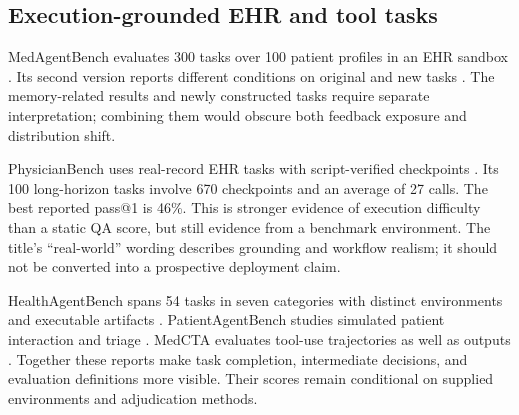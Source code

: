 \subsection{Execution-grounded EHR and tool tasks}
MedAgentBench evaluates 300 tasks over 100 patient profiles in an EHR sandbox \cite{medagentbench2025}. Its second version reports different conditions on original and new tasks \cite{medagentbenchv2}. The memory-related results and newly constructed tasks require separate interpretation; combining them would obscure both feedback exposure and distribution shift.

PhysicianBench uses real-record EHR tasks with script-verified checkpoints \cite{physicianbench2026}. Its 100 long-horizon tasks involve 670 checkpoints and an average of 27 calls. The best reported pass@1 is 46\%. This is stronger evidence of execution difficulty than a static QA score, but still evidence from a benchmark environment. The title's ``real-world'' wording describes grounding and workflow realism; it should not be converted into a prospective deployment claim.

HealthAgentBench spans 54 tasks in seven categories with distinct environments and executable artifacts \cite{healthagentbench2026}. PatientAgentBench studies simulated patient interaction and triage \cite{patientagentbench2026}. MedCTA evaluates tool-use trajectories as well as outputs \cite{medcta2026}. Together these reports make task completion, intermediate decisions, and evaluation definitions more visible. Their scores remain conditional on supplied environments and adjudication methods.

